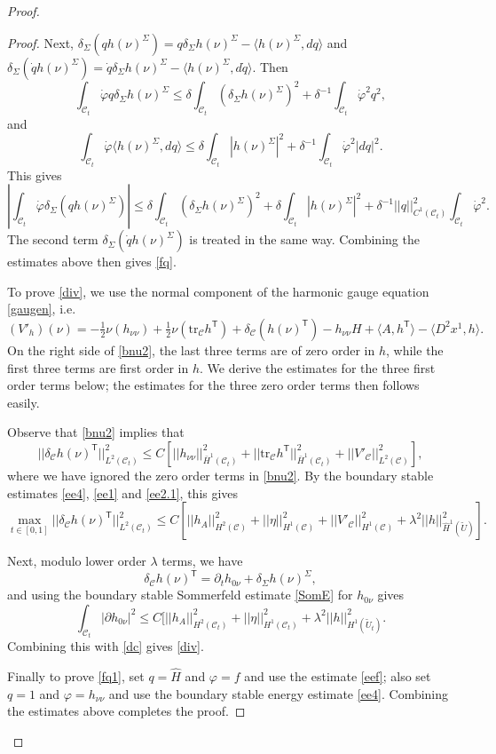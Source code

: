 \documentclass[10pt]{amsart}
\renewcommand{\d}{\delta}
\newcommand{\f}{\varphi}
\newcommand{\Si}{\Sigma}
\renewcommand{\l}{\lambda}
\newcommand{\cC}{{\mathcal C}}
\newcommand{\tT}{\mathsf{T}}
\newcommand{\be}{\begin{equation}}
\newcommand{\ee}{\end{equation}}
\newcommand{\tr}{\mathrm{tr}}
\newcommand{\p}{\partial}
\renewcommand{\hat}{\widehat}
\newcommand{\<}{\langle}
\renewcommand{\>}{\rangle}
\newcommand{\w}{\widetilde}
\theoremstyle{plain}
\theoremstyle{remark}
\theoremstyle{definition}
\numberwithin{equation}{section}
\begin{document}
\begin{proof}
\begin{proof}
   Next, $\d_{\Si}(q h(\nu)^{\Si}) = q \d_{\Si}h(\nu)^{\Si} - \<h(\nu)^{\Si}, d q\>$ and $\d_{\Si}(\dot q h(\nu)^{\Si}) = \dot q \d_{\Si} h(\nu)^{\Si} - 
\<h(\nu)^{\Si}, d \dot q\>$. Then 
$$\int_{\cC_t}\dot \f q \d_{\Si}h(\nu)^{\Si} \leq \d \int_{\cC_t}(\d_{\Si}h(\nu)^{\Si})^2 + \d^{-1} \int_{\cC_t} \dot \f^2 q^2,$$
and
$$\int_{\cC_t}\dot \f \<h(\nu)^{\Si}, dq\> \leq \d \int_{\cC_t}|h(\nu)^{\Si}|^2 + \d^{-1} \int_{\cC_t} \dot \f^2 |dq|^2.$$
This gives 
$$| \int_{\cC_t}\dot \f \d_{\Si}(q h(\nu)^{\Si}) | \leq \d \int_{\cC_t}(\d_{\Si}h(\nu)^{\Si})^2 + \d \int_{\cC_t}|h(\nu)^{\Si}|^2 + 
\d^{-1} ||q||_{C^1(\cC_t)}^2 \int_{\cC_t} \dot \f^2.$$
The second term $\d_{\Si}(\dot q h(\nu)^{\Si})$ is treated in the same way. Combining the estimates above then gives \eqref{fq}. 

  To prove \eqref{div}, we use the normal component of the harmonic gauge equation \eqref{gaugen}, i.e.  
\be \label{bnu2}
(V'_h)(\nu) = -\tfrac{1}{2}\nu(h_{\nu \nu}) + \tfrac{1}{2}\nu(\tr_{\cC}h^{\tT}) + \d_{\cC}(h(\nu)^{\tT}) - h_{\nu \nu}H + \<A, h^{\tT}\> - \<D^2 x^1, h\>.
\ee
On the right side of \eqref{bnu2}, the last three terms are of zero order in $h$, while the first three terms are first order in $h$. We derive the  
estimates for the three first order terms below; the estimates for the three zero order terms then follows easily. 

  Observe that \eqref{bnu2} implies that  
$$||\d_{\cC}h(\nu)^{\tT}||_{L^2(\cC_t)}^2 \leq C[ ||h_{\nu \nu}||_{\bar H^1(\cC_t)}^2 + ||\tr_{\cC}h^{\tT}||_{\bar H^1(\cC_t)}^2 + ||V'_{\cC}||_{L^2(\cC)}^2],$$
where we have ignored the zero order terms in \eqref{bnu2}. By the boundary stable estimates 
\eqref{ee4}, \eqref{ee1} and \eqref{ee2.1}, this gives 
\be \label{dc}
\max_{t\in [0,1]} ||\d_{\cC}h(\nu)^{\tT}||_{L^2(\cC_t)}^2 \leq C[ ||h_A||_{H^2(\cC)}^2 + ||\eta||_{H^1(\cC)}^2 + ||V'_{\cC}||_{H^1(\cC)}^2 + 
\l^2 ||h||_{\hat H^1(\w U)}^2 ].
\ee

  Next, modulo lower order $\l$ terms, we have 
$$\d_{\cC}h(\nu)^{\tT} = \p_t h_{0\nu} + \d_{\Si}h(\nu)^{\Si},$$
and using the boundary stable Sommerfeld estimate \eqref{SomE} for $h_{0\nu}$ gives 
$$\int_{\cC_t}|\p h_{0\nu}|^2 \leq C [ ||h_A||_{H^2(\cC_t)}^2 + ||\eta||_{H^1(\cC_t)}^2 + \l^2 ||h||_{H^1(\w U_t)}^2.$$
Combining this with \eqref{dc} gives \eqref{div}. 

  Finally to prove \eqref{fq1}, set $q = \hat H$ and $\f = f$ and use the estimate \eqref{eef}; also set $q = 1$ and $\f = h_{\nu \nu}$ and 
use the boundary stable energy estimate \eqref{ee4}. Combining the estimates above completes the proof. 


\end{proof}
\end{proof}
\end{document}
